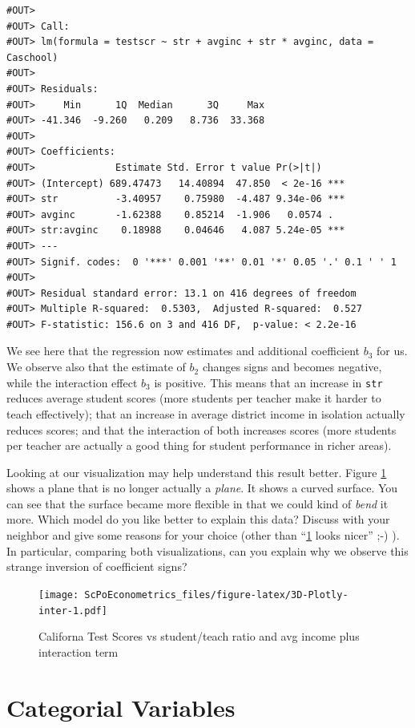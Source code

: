 \documentclass[]{book}
\theoremstyle{definition}
\theoremstyle{definition}
\theoremstyle{definition}
\theoremstyle{remark}
\begin{document}
\begin{verbatim}
#OUT> 
#OUT> Call:
#OUT> lm(formula = testscr ~ str + avginc + str * avginc, data = Caschool)
#OUT> 
#OUT> Residuals:
#OUT>     Min      1Q  Median      3Q     Max 
#OUT> -41.346  -9.260   0.209   8.736  33.368 
#OUT> 
#OUT> Coefficients:
#OUT>              Estimate Std. Error t value Pr(>|t|)    
#OUT> (Intercept) 689.47473   14.40894  47.850  < 2e-16 ***
#OUT> str          -3.40957    0.75980  -4.487 9.34e-06 ***
#OUT> avginc       -1.62388    0.85214  -1.906   0.0574 .  
#OUT> str:avginc    0.18988    0.04646   4.087 5.24e-05 ***
#OUT> ---
#OUT> Signif. codes:  0 '***' 0.001 '**' 0.01 '*' 0.05 '.' 0.1 ' ' 1
#OUT> 
#OUT> Residual standard error: 13.1 on 416 degrees of freedom
#OUT> Multiple R-squared:  0.5303,  Adjusted R-squared:  0.527 
#OUT> F-statistic: 156.6 on 3 and 416 DF,  p-value: < 2.2e-16
\end{verbatim}

We see here that the regression now estimates and additional coefficient
\(b_3\) for us. We observe also that the estimate of \(b_2\) changes
signs and becomes negative, while the interaction effect \(b_3\) is
positive. This means that an increase in \texttt{str} reduces average
student scores (more students per teacher make it harder to teach
effectively); that an increase in average district income in isolation
actually reduces scores; and that the interaction of both increases
scores (more students per teacher are actually a good thing for student
performance in richer areas).

Looking at our visualization may help understand this result better.
Figure \ref{fig:3D-Plotly-inter} shows a plane that is no longer
actually a \emph{plane}. It shows a curved surface. You can see that the
surface became more flexible in that we could kind of \emph{bend} it
more. Which model do you like better to explain this data? Discuss with
your neighbor and give some reasons for your choice (other than
``\ref{fig:3D-Plotly-inter} looks nicer'' ;-) ). In particular,
comparing both visualizations, can you explain why we observe this
strange inversion of coefficient signs?

\begin{figure}
\centering
\texttt{[image: ScPoEconometrics\_files/figure-latex/3D-Plotly-inter-1.pdf]}
\caption{\label{fig:3D-Plotly-inter}Californa Test Scores vs student/teach
ratio and avg income plus interaction term}
\end{figure}

\chapter{Categorial Variables}\label{categorical-vars}
\end{document}
